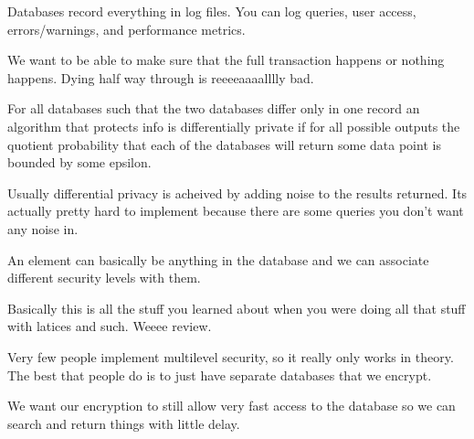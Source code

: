 \documentclass{article}
\begin{document}
Databases record everything in log files. You can log queries, user access, errors/warnings, and performance metrics. 

We want to be able to make sure that the full transaction happens or nothing happens. Dying half way through is reeeeaaaalllly bad.

For all databases such that the two databases differ only in one record an algorithm that protects info is differentially private if for all possible outputs the quotient probability that each of the databases will return some data point is bounded by some epsilon. 

Usually differential privacy is acheived by adding noise to the results returned. Its actually pretty hard to implement because there are some queries you don't want any noise in.


An element can basically be anything in the database and we can associate different security levels with them. 

Basically this is all the stuff you learned about when you were doing all that stuff with latices and such. Weeee review.

Very few people implement multilevel security, so it really only works in theory. The best that people do is to just have separate databases that we encrypt. 

We want our encryption to still allow very fast access to the database so we can search and return things with little delay.



\end{document}

